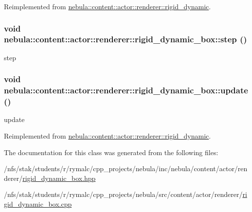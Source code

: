 Reimplemented from \hyperlink{classnebula_1_1content_1_1actor_1_1renderer_1_1rigid__dynamic_a6c0f68639544063b7a7bf404fdbc1370}{nebula::content::actor::renderer::rigid\_\-dynamic}.\hypertarget{classnebula_1_1content_1_1actor_1_1renderer_1_1rigid__dynamic__box_aaf97e5f4b49f87941223bc5ddd87d643}{
\subsubsection[{step}]{\setlength{\rightskip}{0pt plus 5cm}void nebula::content::actor::renderer::rigid\_\-dynamic\_\-box::step ()}}
\label{classnebula_1_1content_1_1actor_1_1renderer_1_1rigid__dynamic__box_aaf97e5f4b49f87941223bc5ddd87d643}


step \hypertarget{classnebula_1_1content_1_1actor_1_1renderer_1_1rigid__dynamic__box_af93072ba126df030c9eb4ec7d2898104}{
\subsubsection[{update}]{\setlength{\rightskip}{0pt plus 5cm}void nebula::content::actor::renderer::rigid\_\-dynamic\_\-box::update ()}}
\label{classnebula_1_1content_1_1actor_1_1renderer_1_1rigid__dynamic__box_af93072ba126df030c9eb4ec7d2898104}


update 

Reimplemented from \hyperlink{classnebula_1_1content_1_1actor_1_1renderer_1_1rigid__dynamic_a53122ec3edecc185ebe31a8bb38be920}{nebula::content::actor::renderer::rigid\_\-dynamic}.

The documentation for this class was generated from the following files:\begin{DoxyCompactItemize}
\item 
/nfs/stak/students/r/rymalc/cpp\_\-projects/nebula/inc/nebula/content/actor/renderer/\hyperlink{renderer_2rigid__dynamic__box_8hpp}{rigid\_\-dynamic\_\-box.hpp}\item 
/nfs/stak/students/r/rymalc/cpp\_\-projects/nebula/src/content/actor/renderer/\hyperlink{renderer_2rigid__dynamic__box_8cpp}{rigid\_\-dynamic\_\-box.cpp}\end{DoxyCompactItemize}
